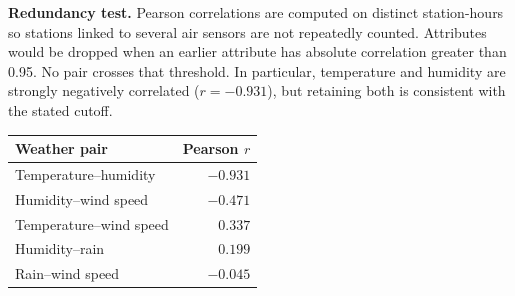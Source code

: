 \documentclass[11pt,a4paper]{article}
\begin{document}
\textbf{Redundancy test.} Pearson correlations are computed on distinct station-hours so stations linked to several air sensors are not repeatedly counted. Attributes would be dropped when an earlier attribute has absolute correlation greater than 0.95. No pair crosses that threshold. In particular, temperature and humidity are strongly negatively correlated ($r=-0.931$), but retaining both is consistent with the stated cutoff.

\begin{center}\begin{tabular}{lr}\toprule
Weather pair & Pearson $r$ \\\midrule
Temperature--humidity & $-0.931$ \\
Humidity--wind speed & $-0.471$ \\
Temperature--wind speed & $0.337$ \\
Humidity--rain & $0.199$ \\
Rain--wind speed & $-0.045$ \\\bottomrule
\end{tabular}\end{center}
\end{document}
